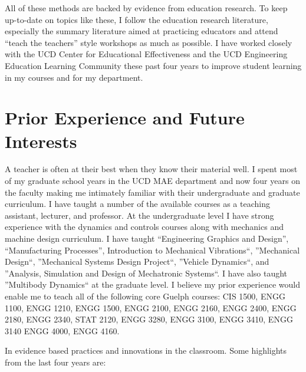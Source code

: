 \documentclass{article}
\begin{document}
All of these methods are backed by evidence from education research. To keep
up-to-date on topics like these, I follow the education research literature,
especially the summary literature aimed at practicing educators and attend
``teach the teachers'' style workshops as much as possible. I have worked
closely with the UCD Center for Educational Effectiveness and the UCD
Engineering Education Learning Community these past four years to improve
student learning in my courses and for my department.

\section*{Prior Experience and Future Interests}
%
A teacher is often at their best when they know their material well. I spent
most of my graduate school years in the UCD MAE department and now four years
on the faculty making me intimately familiar with their undergraduate and
graduate curriculum. I have taught a number of the available courses as a
teaching assistant, lecturer, and professor. At the undergraduate level I have
strong experience with the dynamics and controls courses along with mechanics
and machine design curriculum. I have taught ``Engineering Graphics and
Design'', ``Manufacturing Processes'', Introduction to Mechanical Vibrations``,
''Mechanical Design``, ''Mechanical Systems Design Project``, ''Vehicle
Dynamics``, and ''Analysis, Simulation and Design of Mechatronic Systems``. I
have also taught ''Multibody Dynamics`` at the graduate level. I believe my
prior experience would enable me to teach all of the following core Guelph
courses: CIS 1500, ENGG 1100, ENGG 1210, ENGG 1500, ENGG 2100, ENGG 2160, ENGG
2400, ENGG 2180, ENGG 2340, STAT 2120, ENGG 3280, ENGG 3100, ENGG 3410, ENGG
3140 ENGG 4000, ENGG 4160.

In evidence based practices and innovations in the classroom. Some highlights
from the last four years are:
\end{document}
